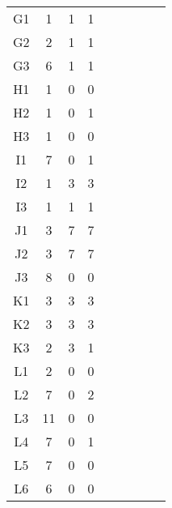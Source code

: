 \begin{center}
\begin{longtable}{ccccc|cccc}
G1    & 1     & 1     & 1 \\
G2    & 2     & 1     & 1 \\
G3    & 6     & 1     & 1 \\
H1    & 1     & 0     & 0 \\
H2    & 1     & 0     & 1 \\
H3    & 1     & 0     & 0 \\
I1    & 7     & 0     & 1 \\
I2    & 1     & 3     & 3 \\
I3    & 1     & 1     & 1 \\
J1    & 3     & 7     & 7 \\
J2    & 3     & 7     & 7 \\
J3    & 8     & 0     & 0 \\
K1    & 3     & 3     & 3 \\
K2    & 3     & 3     & 3 \\
K3    & 2     & 3     & 1 \\
L1    & 2     & 0     & 0 \\
L2    & 7     & 0     & 2 \\
L3    & 11    & 0     & 0 \\
L4    & 7     & 0     & 1 \\
L5    & 7     & 0     & 0 \\
L6    & 6     & 0     & 0 \\

\end{longtable}
\end{center}

